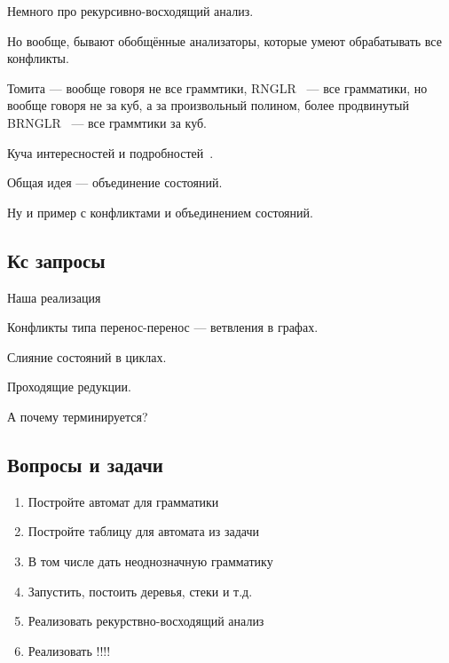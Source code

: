 Немного про рекурсивно-восходящий анализ.

Но вообще, бывают обобщённые анализаторы, которые умеют обрабатывать все конфликты.

Томита --- вообще говоря не все граммтики, RNGLR~\cite{Scott:2006:RNG:1146809.1146810} --- все грамматики, но вообще говоря не за куб, а за произвольный полином, более продвинутый BRNGLR~\cite{!!!} --- все граммтики за куб.

Куча интересностей и подробностей~\cite{DBLP:phd/ethos/Economopoulos06}.

Общая идея --- объединение состояний. 

\begin{example}
Ну и пример с конфликтами и объединением состояний.
\end{example}


\subsection{Кс запросы}


Наша реализация~\cite{10.1007/978-3-319-41579-6_22}

Конфликты типа перенос-перенос --- ветвления в графах.

Слияние состояний в циклах.

Проходящие редукции.

А почему терминируется?


\subsection{Вопросы и задачи}
\begin{enumerate}
\item Постройте автомат для грамматики
\item Постройте таблицу для автомата из задачи
\item В том числе дать неоднозначную грамматику
\item Запустить, постоить деревья, стеки и т.д.
\item Реализовать рекурствно-восходящий анализ
\item Реализовать !!!!
\end{enumerate}
